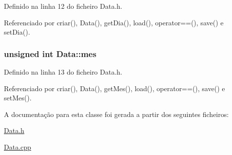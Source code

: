 Definido na linha 12 do ficheiro Data.\+h.



Referenciado por criar(), Data(), get\+Dia(), load(), operator==(), save() e set\+Dia().

\hypertarget{class_data_a586deb479ec2031a0d3ceec8280f7706}{
\subsubsection[{mes}]{\setlength{\rightskip}{0pt plus 5cm}unsigned int Data\+::mes\hspace{0.3cm}{\ttfamily [protected]}}}\label{class_data_a586deb479ec2031a0d3ceec8280f7706}


Definido na linha 13 do ficheiro Data.\+h.



Referenciado por criar(), Data(), get\+Mes(), load(), operator==(), save() e set\+Mes().



A documentação para esta classe foi gerada a partir dos seguintes ficheiros\+:\begin{DoxyCompactItemize}
\item 
\hyperlink{_data_8h}{Data.\+h}\item 
\hyperlink{_data_8cpp}{Data.\+cpp}\end{DoxyCompactItemize}
